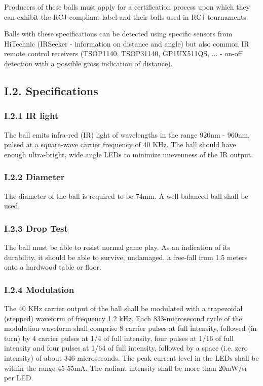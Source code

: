 \documentclass{article}
\begin{document}
Producers of these balls must apply for a certification process upon which they can exhibit the RCJ-compliant label and their balls used in RCJ tournaments. 

Balls with these specifications can be detected using specific sensors from HiTechnic (IRSeeker - information on distance and angle) but also common IR remote control receivers (TSOP1140, TSOP31140, GP1UX511QS, ... - on-off detection with a possible gross indication of distance).

\subsection{I.2. Specifications} 

\subsubsection{I.2.1 IR light} 

The ball emits infra-red (IR) light of wavelengths in the range 920nm - 960nm, pulsed at a square-wave carrier frequency of 40 KHz. The ball should have enough ultra-bright, wide angle LEDs to minimize unevenness of the IR output.

\subsubsection{I.2.2 Diameter} 

The diameter of the ball is required to be 74mm. A well-balanced ball shall be used. 

\subsubsection{I.2.3 Drop Test} 

The ball must be able to resist normal game play. As an indication of its durability, it should be able to survive, undamaged, a free-fall from 1.5 meters onto a hardwood table or floor.

\subsubsection{I.2.4 Modulation} 

The 40 KHz carrier output of the ball shall be modulated with a trapezoidal (stepped) waveform of frequency 1.2 kHz. Each 833-microsecond cycle of the modulation waveform shall comprise 8 carrier pulses at full intensity, followed (in turn) by 4 carrier pulses at 1/4 of full intensity, four pulses at 1/16 of full intensity and four pulses at 1/64 of full intensity, followed by a space (i.e. zero intensity) of about 346 microseconds. The peak current level in the LEDs shall be within the range 45-55mA. The radiant intensity shall be more than 20mW/sr per LED. 
\end{document}
